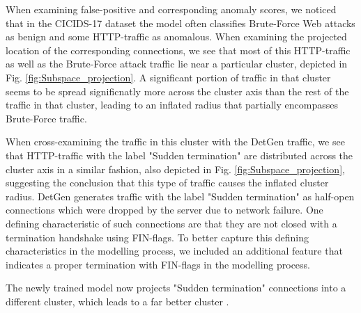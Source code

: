 \documentclass[sigconf]{acmart}
\begin{document}
When examining false-positive and corresponding anomaly scores, we noticed that in the CICIDS-17 dataset the model often classifies Brute-Force Web attacks as benign and some HTTP-traffic as anomalous. When examining the projected location of the corresponding connections, we see that most of this HTTP-traffic as well as the Brute-Force attack traffic lie near a particular cluster, depicted in Fig. \ref{fig:Subspace_projection}. A significant portion of traffic in that cluster seems to be spread significnatly more across the cluster axis than the rest of the traffic in that cluster, leading to an inflated radius that partially encompasses Brute-Force traffic. 

When cross-examining the traffic in this cluster with the DetGen traffic, we see that HTTP-traffic with the label "Sudden termination" are distributed across the cluster axis in a similar fashion, also depicted in Fig. \ref{fig:Subspace_projection}, suggesting the conclusion that this type of traffic causes the inflated cluster radius. DetGen generates traffic with the label "Sudden termination" as half-open connections which were dropped by the server due to network failure. One defining characteristic of such connections are that they are not closed with a termination handshake using FIN-flags. To better capture this defining characteristics in the modelling process, we included an additional feature that indicates a proper termination with FIN-flags in the modelling process. 

The newly trained model now projects "Sudden termination" connections into a different cluster, which leads to a far better cluster .

\end{document}
